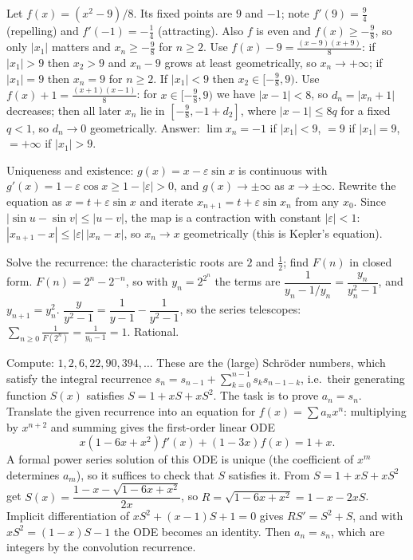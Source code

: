 \documentclass[11pt,a4paper]{article}
\begin{document}

 Let $f(x)=(x^2-9)/8$. Its fixed points are $9$ and $-1$; note $f'(9)=\frac94$ (repelling) and $f'(-1)=-\frac14$ (attracting). Also $f$ is even and $f(x)\ge-\frac98$, so only $|x_1|$ matters and $x_n\ge-\frac98$ for $n\ge2$.
 Use $f(x)-9=\frac{(x-9)(x+9)}8$: if $|x_1|>9$ then $x_2>9$ and $x_n-9$ grows at least geometrically, so $x_n\to+\infty$; if $|x_1|=9$ then $x_n=9$ for $n\ge2$.
 If $|x_1|<9$ then $x_2\in[-\frac98,9)$. Use $f(x)+1=\frac{(x+1)(x-1)}8$: for $x\in[-\frac98,9)$ we have $|x-1|<8$, so $d_n=|x_n+1|$ decreases; then all later $x_n$ lie in $[-\frac98,-1+d_2]$, where $|x-1|\le 8q$ for a fixed $q<1$, so $d_n\to0$ geometrically.
 Answer: $\lim x_n=-1$ if $|x_1|<9$, $=9$ if $|x_1|=9$, $=+\infty$ if $|x_1|>9$.

 Uniqueness and existence: $g(x)=x-\varepsilon\sin x$ is continuous with $g'(x)=1-\varepsilon\cos x\ge1-|\varepsilon|>0$, and $g(x)\to\pm\infty$ as $x\to\pm\infty$.
 Rewrite the equation as $x=t+\varepsilon\sin x$ and iterate $x_{n+1}=t+\varepsilon\sin x_n$ from any $x_0$. Since $|\sin u-\sin v|\le|u-v|$, the map is a contraction with constant $|\varepsilon|<1$: $|x_{n+1}-x|\le|\varepsilon|\,|x_n-x|$, so $x_n\to x$ geometrically (this is Kepler's equation).

 Solve the recurrence: the characteristic roots are $2$ and $\frac12$; find $F(n)$ in closed form.
 $F(n)=2^n-2^{-n}$, so with $y_n=2^{2^n}$ the terms are $\dfrac1{y_n-1/y_n}=\dfrac{y_n}{y_n^2-1}$, and $y_{n+1}=y_n^2$.
 $\dfrac{y}{y^2-1}=\dfrac1{y-1}-\dfrac1{y^2-1}$, so the series telescopes: $\sum_{n\ge0}\frac1{F(2^n)}=\frac1{y_0-1}=1$. Rational.

 Compute: $1,2,6,22,90,394,\dots$ These are the (large) Schr\"oder numbers, which satisfy the integral recurrence $s_n=s_{n-1}+\sum_{k=0}^{n-1}s_ks_{n-1-k}$, i.e.\ their generating function $S(x)$ satisfies $S=1+xS+xS^2$. The task is to prove $a_n=s_n$.
 Translate the given recurrence into an equation for $f(x)=\sum a_nx^n$: multiplying by $x^{n+2}$ and summing gives the first-order linear ODE
\[x(1-6x+x^2)f'(x)+(1-3x)f(x)=1+x .\]
A formal power series solution of this ODE is unique (the coefficient of $x^m$ determines $a_m$), so it suffices to check that $S$ satisfies it.
 From $S=1+xS+xS^2$ get $S(x)=\dfrac{1-x-\sqrt{1-6x+x^2}}{2x}$, so $R=\sqrt{1-6x+x^2}=1-x-2xS$. Implicit differentiation of $xS^2+(x-1)S+1=0$ gives $RS'=S^2+S$, and with $xS^2=(1-x)S-1$ the ODE becomes an identity. Then $a_n=s_n$, which are integers by the convolution recurrence.
\end{document}
